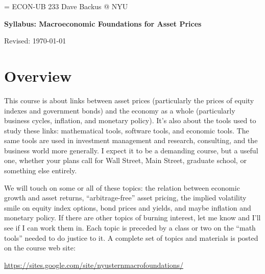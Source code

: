 \documentclass[11pt]{article}
\begin{document}
\parskip=\bigskipamount
\parindent=0.0in
\thispagestyle{empty}
{\large ECON-UB 233 \hfill Dave Backus @ NYU}

\bigskip\bigskip
\centerline{\Large \bf Syllabus:  Macroeconomic Foundations for Asset Prices}
\centerline{Revised: \today}


\section*{Overview}

This course is about links between asset prices
(particularly the prices of equity indexes and government bonds)
and the economy as a whole (particularly business cycles, inflation, and monetary policy).
It's also about the tools used to study these links:
mathematical tools, software tools, and economic tools.
The same tools are used in
investment management and research, consulting, and the business world more generally.
I expect it to be a demanding course, but a useful one,
whether your plans call for Wall Street, Main Street,
graduate school, or something else entirely.

\begin{comment}
The skills we'll develop to collect, manipulate,
and interpret data
are among the most valuable you can have in modern life,
and they're not easy to learn on your own.
You will learn to think about data from the
perspective of quantitative models,
to use professional software
(Matlab, not Excel!) to manipulate data,
and to use data to apply and develop models.
Our applications are to macroeconomics and finance,
but the skills you acquire here are general ones.
\end{comment}

We will touch on some or all of these topics:
the relation between economic growth and asset returns,
``arbitrage-free'' asset pricing,
the implied volatility smile on equity index options,
bond prices and yields, and maybe inflation and monetary policy.
If there are other topics of burning interest, let me know
and I'll see if I can work them in.
Each topic is preceded by a class or two on
the ``math tools'' needed to do justice to it.
A complete set of topics and materials is posted on
the course web site:

\vspace*{\parskip}
\centerline{\url{https://sites.google.com/site/nyusternmacrofoundations/}}
\end{document}
